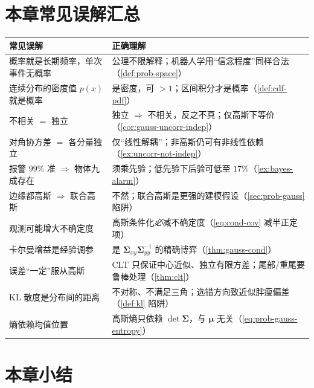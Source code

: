 \section*{本章常见误解汇总}
\begin{table}[H]\centering\small
\begin{tabular}{p{} p{}}
\toprule
\textbf{常见误解} & \textbf{正确理解} \\
\midrule
概率就是长期频率，单次事件无概率 & 公理不限解释；机器人学用“信念程度”同样合法（\cref{def:prob-space}）\\
连续分布的密度值 $p(x)$ 就是概率 & 是密度，可 $>1$；区间积分才是概率（\cref{def:cdf-pdf}）\\
不相关 $=$ 独立 & 独立 $\Rightarrow$ 不相关，反之不真；仅高斯下等价（\cref{cor:gauss-uncorr-indep}）\\
对角协方差 $=$ 各分量独立 & 仅“线性解耦”；非高斯仍可有非线性依赖（\cref{ex:uncorr-not-indep}）\\
报警 $99\%$ 准 $\Rightarrow$ 物体九成存在 & 须乘先验；低先验下后验可低至 $17\%$（\cref{ex:bayes-alarm}）\\
边缘都高斯 $\Rightarrow$ 联合高斯 & 不然；联合高斯是更强的建模假设（\cref{sec:prob-gauss} 陷阱）\\
观测可能增大不确定度 & 高斯条件化\emph{必}减不确定度（\cref{eq:cond-cov} 减半正定项）\\
卡尔曼增益是经验调参 & 是 $\boldsymbol{\Sigma}_{xy}\boldsymbol{\Sigma}_{yy}^{-1}$ 的精确博弈（\cref{thm:gauss-cond}）\\
误差“一定”服从高斯 & CLT 只保证中心近似、独立有限方差；尾部/重尾要鲁棒处理（\cref{thm:clt}）\\
KL 散度是分布间的距离 & 不对称、不满足三角；选错方向致近似胖瘦偏差（\cref{def:kl} 陷阱）\\
熵依赖均值位置 & 高斯熵只依赖 $\det\boldsymbol{\Sigma}$，与 $\boldsymbol{\mu}$ 无关（\cref{eq:prob-gauss-entropy}）\\
\bottomrule
\end{tabular}
\end{table}

\section*{本章小结}

